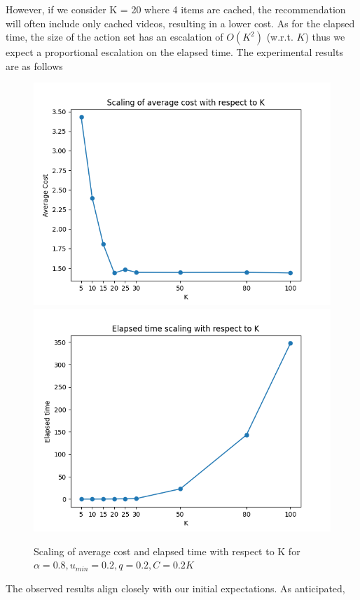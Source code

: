 \documentclass[12pt]{article}
\begin{document}
However, if we consider K = 20 where 4 items are cached, the recommendation will often include only cached videos,
 resulting in a lower cost. As for the elapsed time, the size of the action set has an escalation of $O(K^2)$ (w.r.t. $K$) thus we expect a proportional escalation on the elapsed time. The experimental results are as follows
  \begin{figure}[H]
    \centering
    \includegraphics[scale = 0.5]{Figure_1_2.png}
    \includegraphics[scale = 0.5]{Figure_1_3.png}
    \caption{Scaling of average cost and elapsed time with respect to K for $\alpha = 0.8, u_{min} = 0.2, q=0.2, C=0.2K$}
\end{figure}
The observed results align closely with our initial expectations. As anticipated,
\end{document}

